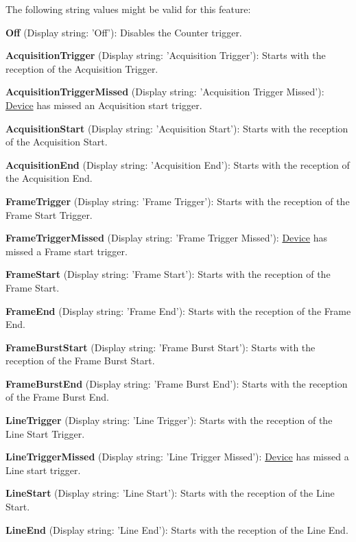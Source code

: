 The following string values might be valid for this feature\+:
\begin{DoxyItemize}
\item {\bfseries Off} (Display string\+: 'Off')\+: Disables the Counter trigger.
\item {\bfseries Acquisition\+Trigger} (Display string\+: 'Acquisition Trigger')\+: Starts with the reception of the Acquisition Trigger.
\item {\bfseries Acquisition\+Trigger\+Missed} (Display string\+: 'Acquisition Trigger Missed')\+: \hyperlink{classmv_i_m_p_a_c_t_1_1acquire_1_1_device}{Device} has missed an Acquisition start trigger.
\item {\bfseries Acquisition\+Start} (Display string\+: 'Acquisition Start')\+: Starts with the reception of the Acquisition Start.
\item {\bfseries Acquisition\+End} (Display string\+: 'Acquisition End')\+: Starts with the reception of the Acquisition End.
\item {\bfseries Frame\+Trigger} (Display string\+: 'Frame Trigger')\+: Starts with the reception of the Frame Start Trigger.
\item {\bfseries Frame\+Trigger\+Missed} (Display string\+: 'Frame Trigger Missed')\+: \hyperlink{classmv_i_m_p_a_c_t_1_1acquire_1_1_device}{Device} has missed a Frame start trigger.
\item {\bfseries Frame\+Start} (Display string\+: 'Frame Start')\+: Starts with the reception of the Frame Start.
\item {\bfseries Frame\+End} (Display string\+: 'Frame End')\+: Starts with the reception of the Frame End.
\item {\bfseries Frame\+Burst\+Start} (Display string\+: 'Frame Burst Start')\+: Starts with the reception of the Frame Burst Start.
\item {\bfseries Frame\+Burst\+End} (Display string\+: 'Frame Burst End')\+: Starts with the reception of the Frame Burst End.
\item {\bfseries Line\+Trigger} (Display string\+: 'Line Trigger')\+: Starts with the reception of the Line Start Trigger.
\item {\bfseries Line\+Trigger\+Missed} (Display string\+: 'Line Trigger Missed')\+: \hyperlink{classmv_i_m_p_a_c_t_1_1acquire_1_1_device}{Device} has missed a Line start trigger.
\item {\bfseries Line\+Start} (Display string\+: 'Line Start')\+: Starts with the reception of the Line Start.
\item {\bfseries Line\+End} (Display string\+: 'Line End')\+: Starts with the reception of the Line End.

\end{DoxyItemize}
